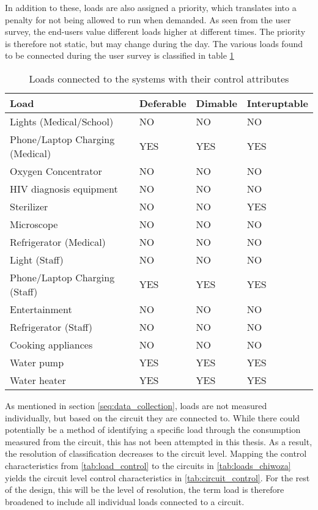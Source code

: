 In addition to these, loads are also assigned a priority, which translates into a penalty for not being allowed to run when demanded. As seen from the user survey, the end-users value different loads higher at different times. The priority is therefore not static, but may change during the day. The various loads found to be connected during the user survey is classified in table \ref{tab:load_control} \\

\begin{table}[]
    \centering
    \small
    \begin{tabular}{|>{\raggedright\arraybackslash}p{4cm}|p{1.5cm}|p{1.5cm}|p{2cm}|}
         Load & Deferable & Dimable & Interuptable \\
         \hline
         Lights (Medical/School) & NO & NO & NO\\
         Phone/Laptop Charging (Medical) & YES & YES & YES\\
         Oxygen Concentrator & NO & NO & NO\\
         HIV diagnosis equipment & NO & NO & NO\\
         Sterilizer & NO & NO & YES\\
         Microscope & NO & NO & NO\\
         Refrigerator (Medical) & NO & NO & NO\\
         \hline
         Light (Staff) & NO & NO & NO\\
         Phone/Laptop Charging (Staff) & YES & YES & YES\\
         Entertainment & NO & NO & NO\\
         Refrigerator (Staff) & NO & NO & NO\\                  
         Cooking appliances & NO & NO & NO\\
         \hline
         Water pump & YES & YES & YES\\
         Water heater & YES & YES & YES\\
         \hline
    \end{tabular}
    \caption[Connected loads control attributes]{Loads connected to the systems with their control attributes}
    \label{tab:load_control}
\end{table}

As mentioned in section \ref{seq:data_collection}, loads are not measured individually, but based on the circuit they are connected to. While there could potentially be a method of identifying a specific load through the consumption measured from the circuit, this has not been attempted in this thesis. As a result, the resolution of classification decreases to the circuit level. Mapping the control characteristics from \autoref{tab:load_control} to the circuits in \autoref{tab:loads_chiwoza} yields the circuit level control characteristics in \autoref{tab:circuit_control}. For the rest of the design, this will be the level of resolution, the term load is therefore broadened to include all individual loads connected to a circuit. 

